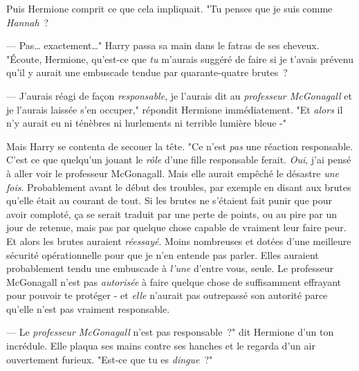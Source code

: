 Puis Hermione comprit ce que cela impliquait. "Tu penses que je suis comme \emph{Hannah}~?

--- Pas… exactement…" Harry passa sa main dans le fatras de ses cheveux. "Écoute, Hermione, qu'est-ce que \emph{tu} m'aurais suggéré de faire si je t'avais prévenu qu'il y aurait une embuscade tendue par quarante-quatre brutes~?

--- J'aurais réagi de façon \emph{responsable}, je l'aurais dit au \emph{professeur McGonagall} et je l'aurais laissée s'en occuper," répondit Hermione immédiatement. "Et \emph{alors} il n'y aurait eu ni ténèbres ni hurlements ni terrible lumière bleue -"

Mais Harry se contenta de secouer la tête. "Ce n'est \emph{pas} une réaction responsable. C'est ce que quelqu'un jouant le \emph{rôle} d'une fille responsable ferait. \emph{Oui}, j'ai pensé à aller voir le professeur McGonagall. Mais elle aurait empêché le désastre \emph{une fois}. Probablement avant le début des troubles, par exemple en disant aux brutes qu'elle était au courant de tout. Si les brutes ne s'étaient fait punir que pour avoir comploté, ça se serait traduit par une perte de points, ou au pire par un jour de retenue, mais pas par quelque chose capable de vraiment leur faire peur. Et alors les brutes auraient \emph{réessayé}. Moins nombreuses et dotées d'une meilleure sécurité opérationnelle pour que je n'en entende pas parler. Elles auraient probablement tendu une embuscade à \emph{l'une} d'entre vous, seule. Le professeur McGonagall n'est pas \emph{autorisée} à faire quelque chose de suffisamment effrayant pour pouvoir te protéger - et \emph{elle} n'aurait pas outrepassé son autorité parce qu'elle n'est pas vraiment responsable.

--- Le \emph{professeur McGonagall} n'est pas responsable~?" dit Hermione d'un ton incrédule. Elle plaqua ses mains contre ses hanches et le regarda d'un air ouvertement furieux. "Est-ce que tu es \emph{dingue}~?"

